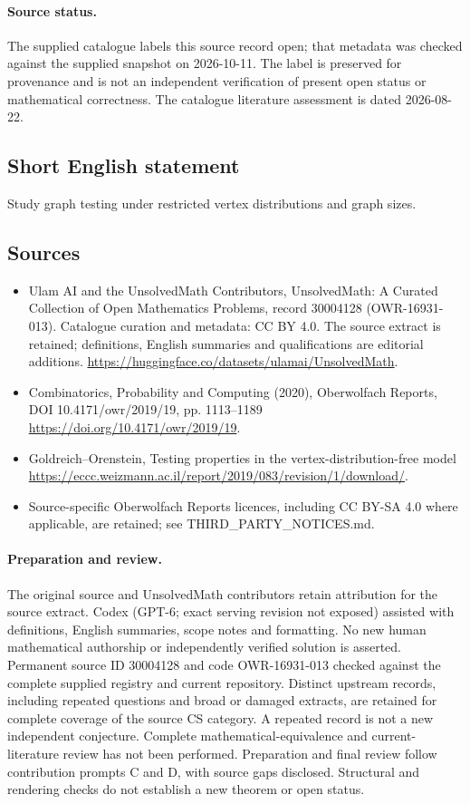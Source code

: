 \documentclass[11pt]{article}
\begin{document}
\paragraph{Source status.}
The supplied catalogue labels this source record open; that metadata was checked against the supplied snapshot on 2026-10-11. The label is preserved for provenance and is not an independent verification of present open status or mathematical correctness. The catalogue literature assessment is dated 2026-08-22.
\subsection{Short English statement}
Study graph testing under restricted vertex distributions and graph sizes.
\subsection{Sources}
\begin{itemize}
\item[\hypertarget{source:30004128:1}{S1}] Ulam AI and the UnsolvedMath Contributors, UnsolvedMath: A Curated Collection of Open Mathematics Problems, record 30004128 (OWR-16931-013). Catalogue curation and metadata: CC BY 4.0. The source extract is retained; definitions, English summaries and qualifications are editorial additions.
\url{https://huggingface.co/datasets/ulamai/UnsolvedMath}.
\item[\hypertarget{source:30004128:2}{S2}] Combinatorics, Probability and Computing (2020), Oberwolfach Reports, DOI 10.4171/owr/2019/19, pp. 1113--1189
\url{https://doi.org/10.4171/owr/2019/19}.
\item[\hypertarget{source:30004128:3}{S3}] Goldreich--Orenstein, Testing properties in the vertex-distribution-free model
\url{https://eccc.weizmann.ac.il/report/2019/083/revision/1/download/}.
\item Source-specific Oberwolfach Reports licences, including CC BY-SA 4.0 where applicable, are retained; see THIRD\_PARTY\_NOTICES.md.
\end{itemize}
\paragraph{Preparation and review.}
The original source and UnsolvedMath contributors retain attribution for the source extract. Codex (GPT-6; exact serving revision not exposed) assisted with definitions, English summaries, scope notes and formatting. No new human mathematical authorship or independently verified solution is asserted. Permanent source ID 30004128 and code OWR-16931-013 checked against the complete supplied registry and current repository. Distinct upstream records, including repeated questions and broad or damaged extracts, are retained for complete coverage of the source CS category. A repeated record is not a new independent conjecture. Complete mathematical-equivalence and current-literature review has not been performed. Preparation and final review follow contribution prompts C and D, with source gaps disclosed. Structural and rendering checks do not establish a new theorem or open status.
\label{end:30004128}
\end{document}
